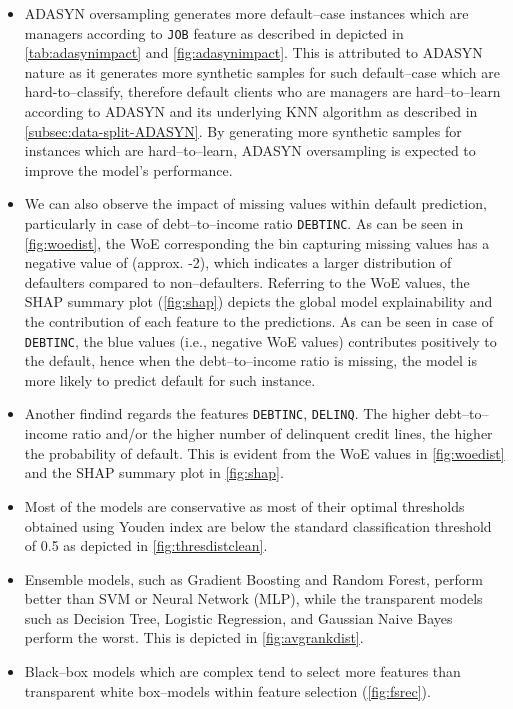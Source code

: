 \begin{itemize}\setlength\itemsep{0em}
    \item ADASYN oversampling generates more default--case instances which are managers according to \texttt{JOB} feature as described in depicted in \autoref{tab:adasynimpact} and \autoref{fig:adasynimpact}.
    This is attributed to ADASYN nature as it generates more synthetic samples for such default--case which are hard-to--classify, therefore default clients who are managers are hard--to--learn according to ADASYN and its underlying KNN algorithm as described in \autoref{subsec:data-split-ADASYN}. By generating more synthetic samples for instances which are hard--to--learn, ADASYN oversampling is expected to improve the model's performance.
    \item We can also observe the impact of missing values within default prediction, particularly in case of debt--to--income ratio \texttt{DEBTINC}. As can be seen in \autoref{fig:woedist}, the WoE corresponding the bin capturing missing values has a negative value of (approx. -2), which indicates a larger distribution of defaulters compared to non--defaulters.
    Referring to the WoE values, the SHAP summary plot (\autoref{fig:shap}) depicts the global model explainability and the contribution of each feature to the predictions. As can be seen in case of \texttt{DEBTINC}, the blue values (i.e., negative WoE values) contributes positively to the default, hence when the debt--to--income ratio is missing, the model is more likely to predict default for such instance.
    \item Another findind regards the features \texttt{DEBTINC}, \texttt{DELINQ}. The higher debt--to--income ratio and/or the higher number of delinquent credit lines, the higher the probability of default. This is evident from the WoE values in \autoref{fig:woedist} and the SHAP summary plot in \autoref{fig:shap}.
    \item Most of the models are conservative as most of their optimal thresholds obtained using Youden index are below the standard classification threshold of 0.5 as depicted in \autoref{fig:thresdistclean}.
    \item Ensemble models, such as Gradient Boosting and Random Forest, perform better than SVM or Neural Network (MLP), while the transparent models such as Decision Tree, Logistic Regression, and Gaussian Naive Bayes perform the worst. This is depicted in \autoref{fig:avgrankdist}.
    \item Black--box models which are complex tend to select more features than transparent white box--models within feature selection (\autoref{fig:fsrec}).
\end{itemize}
